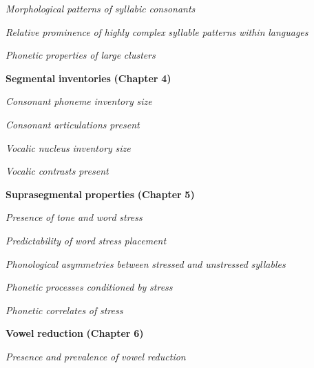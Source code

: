 \textit{Morphological} \textit{patterns} \textit{of} \textit{syllabic} \textit{consonants}



\textit{Relative} \textit{prominence} \textit{of} \textit{highly} \textit{complex} \textit{syllable} \textit{patterns} \textit{within} \textit{languages}



\textit{Phonetic} \textit{properties} \textit{of} \textit{large} \textit{clusters}



\textbf{Segmental} \textbf{inventories} \textbf{(Chapter} \textbf{4)}



\textit{Consonant} \textit{phoneme} \textit{inventory} \textit{size}



\textit{Consonant} \textit{articulations} \textit{present}



\textit{Vocalic} \textit{nucleus} \textit{inventory} \textit{size}



\textit{Vocalic} \textit{contrasts} \textit{present}



\textbf{Suprasegmental} \textbf{properties} \textbf{(Chapter} \textbf{5)}



\textit{Presence} \textit{of} \textit{tone} \textit{and} \textit{word} \textit{stress}



\textit{Predictability} \textit{of} \textit{word} \textit{stress} \textit{placement}



\textit{Phonological} \textit{asymmetries} \textit{between} \textit{stressed} \textit{and} \textit{unstressed} \textit{syllables}



\textit{Phonetic} \textit{processes} \textit{conditioned} \textit{by} \textit{stress}



\textit{Phonetic} \textit{correlates} \textit{of} \textit{stress}



\textbf{Vowel} \textbf{reduction} \textbf{(Chapter} \textbf{6)}



\textit{Presence} \textit{and} \textit{prevalence} \textit{of} \textit{vowel} \textit{reduction}



